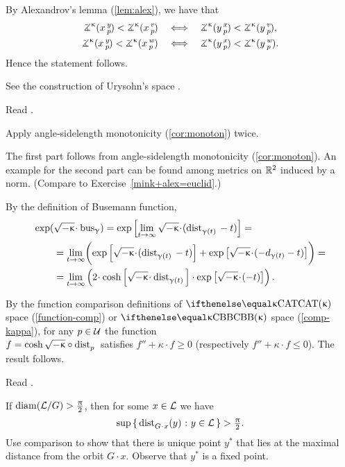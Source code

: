 By Alexandrov's lemma (\ref{lem:alex}), we have that 
\begin{align*}
\angk\kappa xyp<\angk\kappa xvp
\quad&\Longleftrightarrow\quad
\angk\kappa yxp<\angk\kappa yvp,
\\
\angk\kappa xyp<\angk\kappa xwp
\quad&\Longleftrightarrow\quad
\angk\kappa yxp<\angk\kappa ywp.
\end{align*}
Hence the statement follows.


 See the construction of Urysohn's space \cite[3.11$\tfrac{3}{2}_+$]{gromov-MS}.

Read \cite{lebedeva-petrunin}.

 Apply angle-sidelength  monotonicity (\ref{cor:monoton}) twice. 

 The first part follows from angle-sidelength  monotonicity (\ref{cor:monoton}).
An example for the second part can be found among metrics on $\mathbb{R}^2$ induced by a norm. (Compare to Exercise~\ref{mink+alex=euclid}.)

By the definition of Busemann function,
\begin{align*}
\exp(&\sqrt{-\kappa}\cdot\bus_\gamma) 
= \exp \left[\lim_{t\to \infty} \sqrt{-\kappa}\cdot(\distfun{{\gamma (t)}}{}{} - t)\right]=
\\
&= \lim_{t\to \infty} \biggl(\exp \left[\sqrt{-\kappa}\cdot(\distfun{\gamma (t)}{}{} -t)\right]
+\exp\left[\sqrt{-\kappa}\cdot(-d_{\gamma (t)}-t)\right]\biggr)=
\\
&=  \lim_{t\to \infty} \left(2\cdot \cosh \left[\sqrt{-\kappa}\cdot\distfun{\gamma (t)}{}{}\right]\cdot \exp\left[\sqrt{-\kappa}\cdot(-t)\right]\right).
\end{align*}

By the function comparison definitions of $\CAT\kappa$ space (\ref{function-comp}) or $\Alex{\kappa}$ space (\ref{comp-kappa}),  for any $p\in \spc{U}$ the function\\ $f=\cosh \sqrt{-\kappa}\circ\distfun{p}{}{}$ satisfies $f''+\kappa \cdot f\ge 0$ (respectively  $f''+\kappa \cdot f\le 0$). The result follows.

 Read \cite{petrunin:globalization}.

 If $\mathop{\rm diam}\nolimits(\mathcal{L}/G)>\tfrac{\uppi}2$, then for some $x\in \spc{L}$ we have
\[\sup \set{\distfun{G\cdot x}(y)}{y\in \spc{L}}
>
\tfrac\pi2.\]
Use comparison to show that there is unique point $y^{*}$ that lies at the maximal distance from the orbit $G\cdot x$.
Observe that $y^{*}$ is a fixed point.

